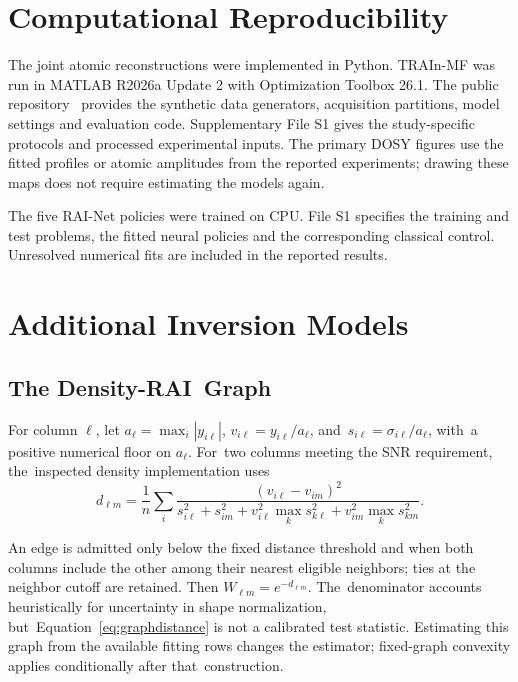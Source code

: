 \documentclass[mathematics,article,accept,moreauthors]{Definitions/mdpi}
\begin{document}
\section{Computational Reproducibility}\label{app:repro}
The joint atomic reconstructions were implemented in Python. TRAIn-MF was run in MATLAB R2026a Update 2 with Optimization Toolbox 26.1. The public repository~\cite{software} provides the synthetic data generators, acquisition partitions, model settings and evaluation code. Supplementary File S1 gives the study-specific protocols and processed experimental inputs. The primary DOSY figures use the fitted profiles or atomic amplitudes from the reported experiments; drawing these maps does not require estimating the models again.

The five RAI-Net policies were trained on CPU. File S1 specifies the training and test problems, the fitted neural policies and the corresponding classical control. Unresolved numerical fits are included in the reported results.


%


\section{Additional Inversion Models}\label{app:extensions}

\subsection{The Density-RAI~Graph}\label{app:graphdetails}
For column $\ell$, let $a_\ell=\max_i|y_{i\ell}|$, $v_{i\ell}=y_{i\ell}/a_\ell$, and~$s_{i\ell}=\sigma_{i\ell}/a_\ell$, with~a positive numerical floor on $a_\ell$. For~two columns meeting the SNR requirement, the~inspected density implementation uses
\begin{equation}\label{eq:graphdistance}
 d_{\ell m}=\frac1n\sum_i
 \frac{(v_{i\ell}-v_{im})^2}
 {s_{i\ell}^2+s_{im}^2+v_{i\ell}^2\max_k s_{k\ell}^2+v_{im}^2\max_k s_{km}^2}.
\end{equation}

An edge is admitted only below the fixed distance threshold and when both columns include the other among their nearest eligible neighbors; ties at the neighbor cutoff are retained. Then $W_{\ell m}=e^{-d_{\ell m}}$. The~denominator accounts heuristically for uncertainty in shape normalization, but~Equation~\eqref{eq:graphdistance} is not a calibrated test statistic. Estimating this graph from the available fitting rows changes the estimator; fixed-graph convexity applies conditionally after that~construction.
\end{document}

